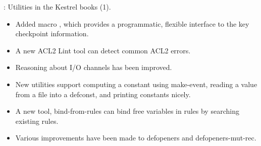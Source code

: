 
\begin{frame}

\implibtitle

: Utilities in the Kestrel books (1).

\begin{itemize}

\item Added macro ,
  which provides a programmatic, flexible interface
  to the key checkpoint information.

\item A new ACL2 Lint tool can detect common ACL2 errors.

\item Reasoning about I/O channels has been improved.

\item New utilities support computing a constant using make-event,
  reading a value from a file into a defconst, and printing constants
  nicely.

\item A new tool, bind-from-rules can bind free variables in rules by
  searching existing rules.

\item Various improvements have been made to defopeners and
  defopeners-mut-rec.

\end{itemize}

\end{frame}


